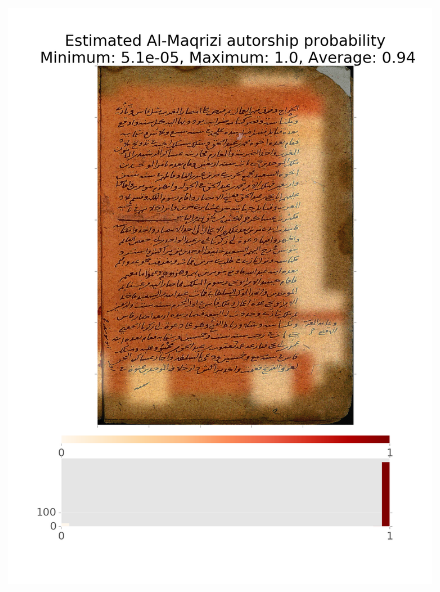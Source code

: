 \documentclass[conference,a4paper,twocolumn]{IEEEtran}
\begin{document}
\begin{figure}
\begin{minipage}{.48\linewidth}
  \includegraphics[width=\linewidth]{figures/sw_al_maqrisi.png}
\end{minipage}
\hspace{.01\linewidth}
\begin{minipage}{.48\linewidth}
	\centering

\end{minipage}
\end{figure}
\end{document}
